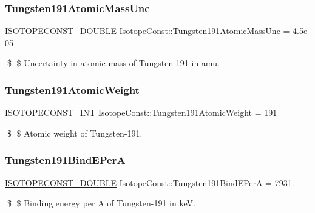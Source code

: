 \subsubsection{\texorpdfstring{Tungsten191\+Atomic\+Mass\+Unc}{Tungsten191AtomicMassUnc}}
{\footnotesize\ttfamily \mbox{\hyperlink{group___isotope_const-_macros_ga8f45a7272ce02c0b4c65c44636ed719a}{I\+S\+O\+T\+O\+P\+E\+C\+O\+N\+S\+T\+\_\+\+D\+O\+U\+B\+LE}} Isotope\+Const\+::\+Tungsten191\+Atomic\+Mass\+Unc = 4.\+5e-\/05}

\$ \$ Uncertainty in atomic mass of Tungsten-\/191 in amu. \mbox{\label{group___isotope_const-_tungsten-_w191_ga97ad4913d5d8dc5756c223ecb1fd4162}} 
\subsubsection{\texorpdfstring{Tungsten191\+Atomic\+Weight}{Tungsten191AtomicWeight}}
{\footnotesize\ttfamily \mbox{\hyperlink{group___isotope_const-_macros_ga5f18360b3e99483a35c32d789e62621c}{I\+S\+O\+T\+O\+P\+E\+C\+O\+N\+S\+T\+\_\+\+I\+NT}} Isotope\+Const\+::\+Tungsten191\+Atomic\+Weight = 191}

\$ \$ Atomic weight of Tungsten-\/191. \mbox{\label{group___isotope_const-_tungsten-_w191_gac65febb9c639392e1275a545e289e793}} 
\subsubsection{\texorpdfstring{Tungsten191\+Bind\+E\+PerA}{Tungsten191BindEPerA}}
{\footnotesize\ttfamily \mbox{\hyperlink{group___isotope_const-_macros_ga8f45a7272ce02c0b4c65c44636ed719a}{I\+S\+O\+T\+O\+P\+E\+C\+O\+N\+S\+T\+\_\+\+D\+O\+U\+B\+LE}} Isotope\+Const\+::\+Tungsten191\+Bind\+E\+PerA = 7931.}

\$ \$ Binding energy per A of Tungsten-\/191 in keV. \mbox{\label{group___isotope_const-_tungsten-_w191_ga0062cca32d76c5bd22e4daf4a68d681c}} 
